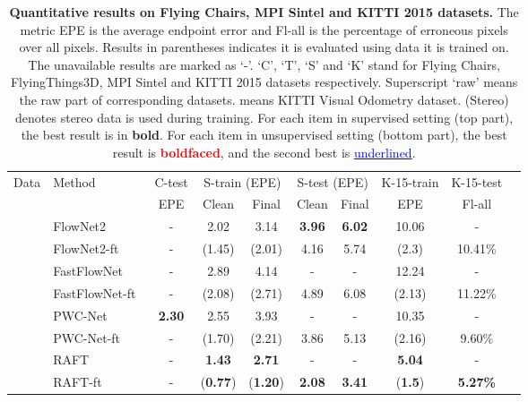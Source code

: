 \documentclass[lettersize,journal]{IEEEtran}
\begin{document}
\begin{table*}[t]
	\caption{\textbf{Quantitative results on Flying Chairs, MPI Sintel and KITTI 2015 datasets.} The metric EPE is the average endpoint error and Fl-all is the percentage of erroneous pixels over all pixels. Results in parentheses indicates it is evaluated using data it is trained on. The unavailable results are marked as `-'. `C', `T', `S' and `K' stand for Flying Chairs, FlyingThings3D, MPI Sintel and KITTI 2015 datasets respectively. Superscript `raw' means the raw part of corresponding datasets.  means KITTI Visual Odometry dataset. (Stereo) denotes stereo data is used during training. For each item in supervised setting (top part), the best result is in \textbf{bold}. For each item in unsupervised setting (bottom part), the best result is \textcolor{red}{\textbf{boldfaced}}, and the second best is \textcolor{blue}{\underline{underlined}}.}
	\label{tab:3}
	\centering
	\renewcommand{\arraystretch}{1.1}
	\tabcolsep=4.4mm
	\begin{tabular}{llcccccccc}
		\toprule
		\multirow{2}{*}{Data} & \multirow{2}{*}{Method} & \multicolumn{1}{c}{C-test} & \multicolumn{2}{c}{S-train (EPE)} & \multicolumn{2}{c}{S-test (EPE)} & \multicolumn{1}{c}{K-15-train} & \multicolumn{1}{c}{K-15-test}\\
		\cmidrule(lr){3-3}
		\cmidrule(lr){4-5}
		\cmidrule(lr){6-7}
		\cmidrule(lr){8-8}
		\cmidrule(lr){9-9}
		& & EPE & Clean & Final & Clean & Final & EPE & Fl-all \\
		\midrule
		 & FlowNet2~\cite{8099662} & - & 2.02 & 3.14 & \textbf{3.96} & \textbf{6.02} & 10.06 & - \\
		 & FlowNet2-ft~\cite{8099662} & - & (1.45) & (2.01) & 4.16 & 5.74 & (2.3) & 10.41\% \\
		 & FastFlowNet~\cite{Kong_2021_ICRA} & - & 2.89 & 4.14 & - & - & 12.24 & - \\
		 & FastFlowNet-ft~\cite{Kong_2021_ICRA} & - & (2.08) & (2.71) & 4.89 & 6.08 & (2.13) & 11.22\% \\
		 & PWC-Net~\cite{8579029} & \textbf{2.30} & 2.55 & 3.93 & - & - & 10.35 & - \\ 
		 & PWC-Net-ft~\cite{8579029} & - & (1.70) & (2.21) & 3.86 & 5.13 & (2.16) & 9.60\% \\
		 & RAFT~\cite{teed2020raft} & - & \textbf{1.43} & \textbf{2.71} & - & - & \textbf{5.04} & - \\
		 & RAFT-ft~\cite{teed2020raft} & - & (\textbf{0.77}) & (\textbf{1.20}) & \textbf{2.08} & \textbf{3.41} & (\textbf{1.5}) & \textbf{5.27\%} \\

\end{tabular}
\end{table*}
\end{document}
